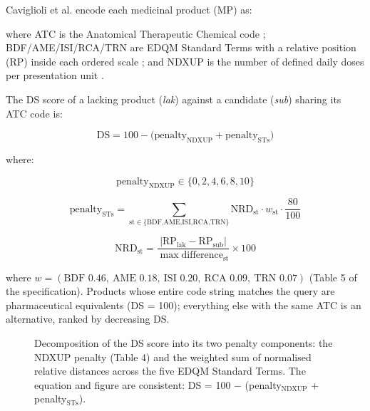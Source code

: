 \documentclass[a4paper]{elsarticle}
\begin{document}
Caviglioli et al.\citep{caviglioli2025medicine} encode each medicinal product (MP) as:


where ATC is the Anatomical Therapeutic Chemical code \citep{who2026atcddd}; BDF/AME/ISI/RCA/TRN are EDQM Standard Terms with a relative position (RP) inside each ordered scale \citep{edqm2024standard,iso202311239}; and NDXUP is the number of defined daily doses per presentation unit \citep{who2026atcddd}.

The DS score of a lacking product (\emph{lak}) against a candidate (\emph{sub}) sharing its ATC code is:

\begin{equation}
\text{DS} = 100 - \bigl(\text{penalty}_{\text{NDXUP}} + \text{penalty}_{\text{STs}}\bigr)
\label{eq:ds}
\end{equation}

where:

\begin{equation}
\text{penalty}_{\text{NDXUP}} \in \{0,2,4,6,8,10\}
\label{eq:ndxup}
\end{equation}

\begin{equation}
\text{penalty}_{\text{STs}} = \sum_{\text{st}\in\{\text{BDF,AME,ISI,RCA,TRN}\}} \text{NRD}_{\text{st}} \cdot w_{\text{st}} \cdot \frac{80}{100}
\label{eq:st}
\end{equation}

\begin{equation}
\text{NRD}_{\text{st}} = \frac{|\text{RP}_{\text{lak}} - \text{RP}_{\text{sub}}|}{\max\text{difference}_{\text{st}}} \times 100
\label{eq:nrd}
\end{equation}

where $w = (\text{BDF }0.46,\ \text{AME }0.18,\ \text{ISI }0.20,\ \text{RCA }0.09,\ \text{TRN }0.07)$ (Table 5 of the specification). Products whose entire code string matches the query are pharmaceutical equivalents (DS = 100); everything else with the same ATC is an alternative, ranked by decreasing DS.

\begin{figure}[htbp]
\centering
\resizebox{\columnwidth}{!}{%
%
}
\caption{Decomposition of the DS score into its two penalty components: the NDXUP penalty (Table 4) and the weighted sum of normalised relative distances across the five EDQM Standard Terms. The equation and figure are consistent: DS = 100 $-$ (penalty$_{\text{NDXUP}}$ + penalty$_{\text{STs}}$).}
\label{fig:ds-formula}
\end{figure}
\end{document}

